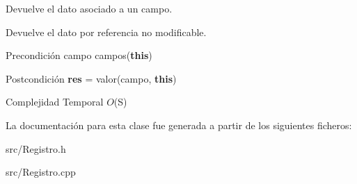 Devuelve el dato asociado a un campo. 

Devuelve el dato por referencia no modificable.

\begin{DoxyPrecond}{Precondición}
campo  campos({\bfseries this}) 
\end{DoxyPrecond}
\begin{DoxyPostcond}{Postcondición}
{\bfseries res} = valor(campo, {\bfseries this})
\end{DoxyPostcond}

\begin{DoxyDescription}
\item[Complejidad Temporal]$O$(S)
\end{DoxyDescription}

La documentación para esta clase fue generada a partir de los siguientes ficheros\+:\begin{DoxyCompactItemize}
\item 
src/Registro.\+h\item 
src/Registro.\+cpp\end{DoxyCompactItemize}
